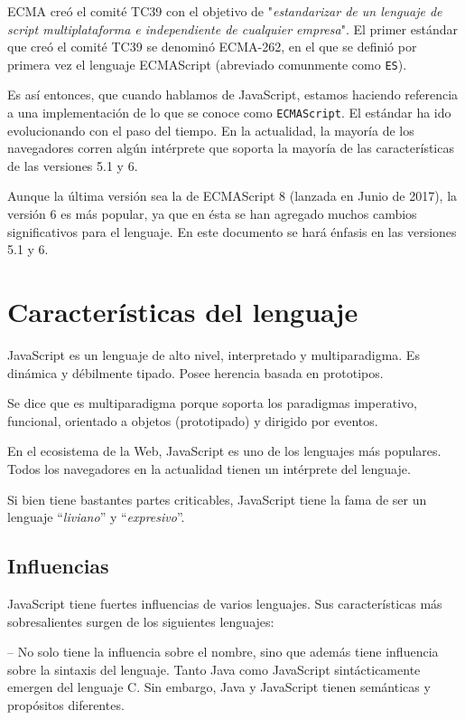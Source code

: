 ECMA creó el comité TC39 con el objetivo de "\emph{estandarizar de un lenguaje de script multiplataforma e independiente de cualquier empresa}". El primer estándar que creó el comité TC39 se denominó ECMA-262, en el que se definió por primera vez el lenguaje ECMAScript (abreviado comunmente como \texttt{ES}).

Es así entonces, que cuando hablamos de JavaScript, estamos haciendo referencia a una implementación de lo que se conoce como \texttt{ECMAScript}. El estándar ha ido evolucionando con el paso del tiempo. En la actualidad, la mayoría de los navegadores corren algún intérprete que soporta la mayoría de las características de las versiones 5.1 y 6. 

Aunque la última versión sea la de ECMAScript 8 (lanzada en Junio de 2017), la versión 6 es más popular, ya que en ésta se han agregado muchos cambios significativos para el lenguaje. En este documento se hará énfasis en las versiones 5.1 y 6.


\section{Características del lenguaje}

JavaScript es un lenguaje de alto nivel, interpretado y multiparadigma. Es dinámica y débilmente tipado. Posee herencia basada en prototipos. 

Se dice que es multiparadigma porque soporta los paradigmas imperativo, funcional, orientado a objetos (prototipado) y dirigido por eventos.

En el ecosistema de la Web, JavaScript es uno de los lenguajes más populares. Todos los navegadores en la actualidad tienen un intérprete del lenguaje.

Si bien tiene bastantes partes criticables, JavaScript tiene la fama de ser un lenguaje "`\textit{liviano}"' y "`\textit{expresivo}"'.

\subsection{Influencias}

JavaScript tiene fuertes influencias de varios lenguajes. Sus características más sobresalientes surgen de los siguientes lenguajes: 

 -- No solo tiene la influencia sobre el nombre, sino que además tiene influencia sobre la sintaxis del lenguaje. Tanto Java como JavaScript sintácticamente emergen del lenguaje C. Sin embargo, Java y JavaScript tienen semánticas y propósitos diferentes.

